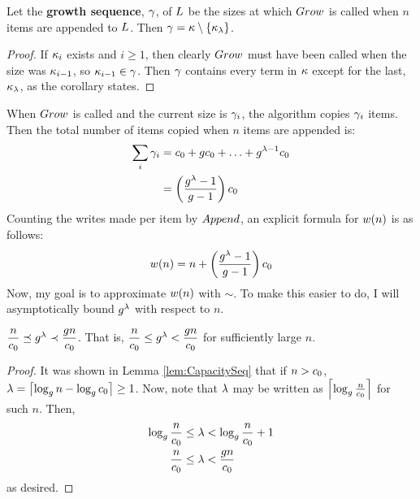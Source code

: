 \begin{corollary}
\label{coro:GrowthSeq}
	Let the \textbf{growth sequence}, $\gamma$, of $L$ be the sizes at which $Grow$ is called when $n$ items are appended to $L$. Then $\gamma = \kappa \setminus \left\{ \kappa_\lambda \right\}$.
\end{corollary}

\begin{proof}
	If $\kappa_i$ exists and $i \geq 1$, then clearly $Grow$ must have been called when the size was $\kappa_{i - 1}$, so $\kappa_{i - 1} \in \gamma$. Then $\gamma$ contains every term in $\kappa$ except for the last, $\kappa_\lambda$, as the corollary states.
\end{proof}

When $Grow$ is called and the current size is $\gamma_i$, the algorithm copies $\gamma_i$ items. Then the total number of items copied when $n$ items are appended is:
\begin{align*}
\sum_i {\gamma_i} &= c_0 + gc_0 + \ldots + g^{\lambda - 1}c_0\\
&= \left( \frac{g^{\lambda} - 1}{g - 1} \right) c_0
\end{align*}
Counting the writes made per item by $Append$, an explicit formula for $w(n)$ is as follows:
\begin{align*}
w(n) = n + \left( \frac{g^\lambda - 1}{g - 1} \right) c_0
\end{align*}
Now, my goal is to approximate $w(n)$ with $\sim$. To make this easier to do, I will asymptotically bound $g^\lambda$ with respect to $n$.

\begin{lemma}
\label{lem:ToVarUsefulPowerBounds}
	$\dfrac n {c_0} \preceq g^\lambda \prec \dfrac {g{n}} {c_0}$. That is, $\dfrac n {c_0} \leq g^\lambda < \dfrac {g{n}} {c_0}$ for sufficiently large $n$.
\end{lemma}

\begin{proof}
	It was shown in Lemma \ref{lem:CapacitySeq} that if $n > c_0$, $\lambda = \left\lceil \log_{g} n - \log_{g} c_0 \right\rceil \geq 1$.  Now, note that $\lambda$ may be written as $\left\lceil \log_{g} \frac {n} {c_0} \right\rceil$ for such $n$. Then,
	\begin{align*}
	\log_{g} \frac {n} {c_0} \leq \lambda &< \log_{g} \frac {n} {c_0} + 1\\
	\frac{n}{c_0} \leq \lambda &< \frac{g{n}}{c_0}
	\end{align*}
	as desired.
\end{proof}

